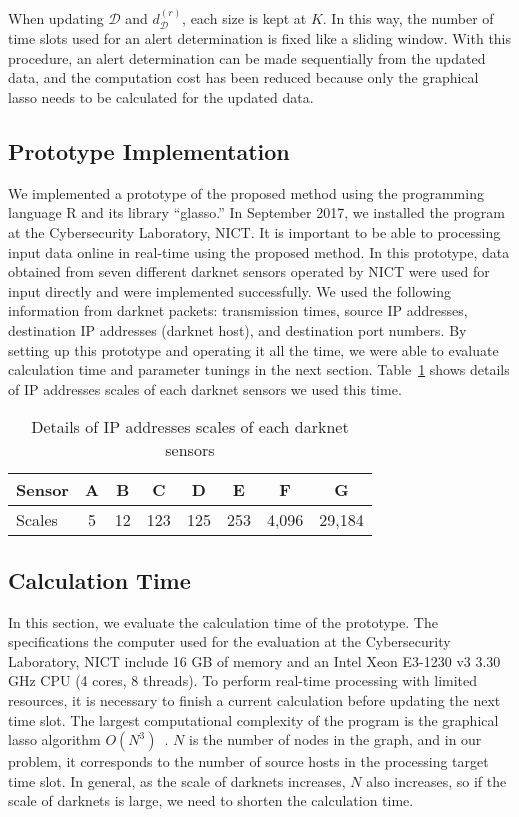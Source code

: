 \documentclass[letterpaper]{sig-alternate-10pt}
\begin{document}
When updating $\mathcal{D}$ and $d_{\mathcal{D}}^{(r)}$, each size is kept at $K$.
In this way, the number of time slots used for an alert determination is fixed like a sliding window.
With this procedure, an alert determination can be made sequentially from the updated data, and the computation cost has been reduced because only the graphical lasso needs to be calculated for the updated data.

\subsection{Prototype Implementation}
We implemented a prototype of the proposed method using the programming language R and its library ``glasso.''
In September 2017, we installed the program at the Cybersecurity Laboratory, NICT.
It is important to be able to processing input data online in real-time using the proposed method.
In this prototype, data obtained from seven different darknet sensors operated by NICT were used for input directly and were implemented successfully.
We used the following information from darknet packets: transmission times, source IP addresses, destination IP addresses (darknet host), and destination port numbers.
By setting up this prototype and operating it all the time, we were able to evaluate calculation time and parameter tunings in the next section.
Table~\ref{tab:sensor} shows details of IP addresses scales of each darknet sensors we used this time.

\begin{table}[htb]
  \begin{center}
    \caption{Details of IP addresses scales of each darknet sensors}
    \begin{tabular}{l|ccccccc} \hline
      Sensor & A & B & C & D & E & F & G \\ \hline
      Scales & 5 & 12 & 123 & 125 & 253 & 4,096 & 29,184 \\ \hline
    \end{tabular}
    \label{tab:sensor}
  \end{center}
\end{table}


\subsection{Calculation Time}
In this section, we evaluate the calculation time of the prototype.
The specifications the computer used for the evaluation at the Cybersecurity Laboratory, NICT include 16 GB of memory and an Intel Xeon E3-1230 v3 3.30 GHz CPU (4 cores, 8 threads).
To perform real-time processing with limited resources, it is necessary to finish a current calculation before updating the next time slot.
The largest computational complexity of the program is the graphical lasso algorithm $O(N^3)$~\cite{Witten}.
$N$ is the number of nodes in the graph, and in our problem, it corresponds to the number of source hosts in the processing target time slot.
In general, as the scale of darknets increases, $N$ also increases, so if the scale of darknets is large, we need to shorten the calculation time.
\end{document}
